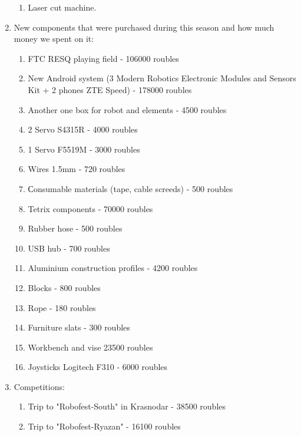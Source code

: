 \begin{enumerate}
\begin{enumerate}
		\item Laser cut machine. 
	\end{enumerate}
	
	\item New components that were purchased during this season and how much money we spent on it:
	\begin{enumerate}
		\item FTC RESQ playing field - 106000 roubles
		
		\item New Android system (3 Modern Robotics Electronic Modules and Sensors Kit + 2 phones ZTE Speed) - 178000 roubles
		
		\item Another one box for robot and elements - 4500 roubles
		
		\item 2 Servo S4315R - 4000 roubles
		
		\item 1 Servo F5519M - 3000 roubles
		
		\item Wires 1.5mm - 720 roubles
		
		\item Сonsumable materials (tape, cable screeds) - 500 roubles
		
		\item Tetrix components - 70000 roubles
		
		\item Rubber hose - 500 roubles
		
		\item USB hub - 700 roubles
		
		\item Aluminium construction profiles - 4200 roubles
		
		\item Blocks - 800 roubles
		
		\item Rope - 180 roubles
		
		\item Furniture slats - 300 roubles
		
		\item Workbench and vise 23500 roubles
		
		\item Joysticks Logitech F310 - 6000 roubles
	\end{enumerate}
	\item Competitions:
	\begin{enumerate}
		\item Trip to "Robofest-South" in Krasnodar - 38500 roubles
		
		\item Trip to "Robofest-Ryazan" - 16100 roubles
		
	\end{enumerate}
\end{enumerate}
\fillpage